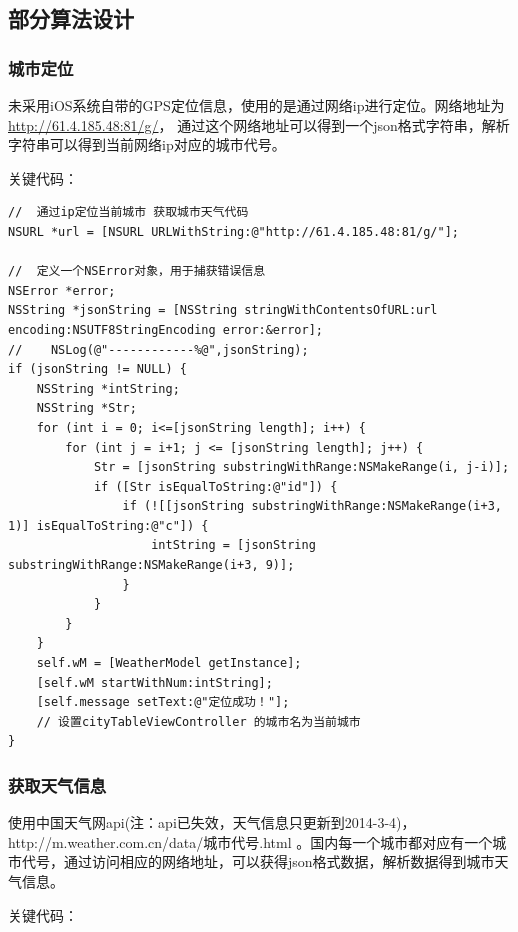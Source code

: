 \documentclass[UTF8,nofonts]{ctexart}
\begin{document}
\subsection{部分算法设计} %
\subsubsection{城市定位}

未采用iOS系统自带的GPS定位信息，使用的是通过网络ip进行定位。网络地址为 \url{http://61.4.185.48:81/g/}， 通过这个网络地址可以得到一个json格式字符串，解析字符串可以得到当前网络ip对应的城市代号。

\newpage
关键代码：

\begin{lstlisting}[language={[ANSI]C++}]
//	通过ip定位当前城市 获取城市天气代码
NSURL *url = [NSURL URLWithString:@"http://61.4.185.48:81/g/"];

//	定义一个NSError对象，用于捕获错误信息
NSError *error;
NSString *jsonString = [NSString stringWithContentsOfURL:url encoding:NSUTF8StringEncoding error:&error];
//    NSLog(@"------------%@",jsonString);
if (jsonString != NULL) {
    NSString *intString;
    NSString *Str;
    for (int i = 0; i<=[jsonString length]; i++) {
        for (int j = i+1; j <= [jsonString length]; j++) {
            Str = [jsonString substringWithRange:NSMakeRange(i, j-i)];
            if ([Str isEqualToString:@"id"]) {
                if (![[jsonString substringWithRange:NSMakeRange(i+3, 1)] isEqualToString:@"c"]) {
                    intString = [jsonString substringWithRange:NSMakeRange(i+3, 9)];
                }
            }
        }
    }
    self.wM = [WeatherModel getInstance];
    [self.wM startWithNum:intString];
    [self.message setText:@"定位成功！"];
    // 设置cityTableViewController 的城市名为当前城市
}
\end{lstlisting}

\subsubsection{获取天气信息}
使用中国天气网api(注：api已失效，天气信息只更新到2014-3-4)，http://m.weather.com.cn/data/城市代号.html 。国内每一个城市都对应有一个城市代号，通过访问相应的网络地址，可以获得json格式数据，解析数据得到城市天气信息。

关键代码：
\end{document}
